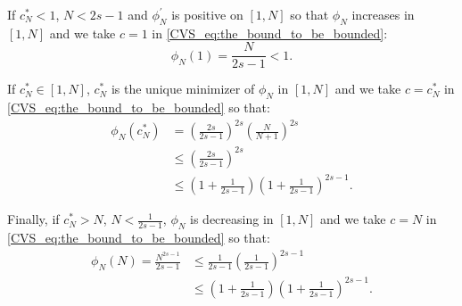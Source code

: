 \documentclass[twoside,11pt]{book}
\numberwithin{theorem}{chapter}
\numberwithin{definition}{chapter}
\numberwithin{proposition}{chapter}
\numberwithin{corollary}{chapter}
\numberwithin{example}{chapter}
\numberwithin{lemma}{chapter}
\numberwithin{assumption}{chapter}
\newcommand{\pc}[1]{\textcolor{blue}{#1}}
\newcommand{\rb}[1]{\textcolor{magenta}{#1}}
\begin{document}
If $c_{N}^{*}< 1$, $N < 2s-1$ and $\phi_{N}^{'}$ is positive on $[1,N]$ so that $\phi_{N}$ increases in $[1,N]$ and we take $c = 1$ in \eqref{CVS_eq:the_bound_to_be_bounded}:
\begin{equation}
\phi_{N}(1) = \frac{N}{2s-1} < 1.
\end{equation}

If $c_{N}^{*} \in [1,N]$, $c_{N}^{*}$ is the unique minimizer of $\phi_{N}$ in $[1,N]$ and we take $c = c_{N}^{*}$ in \eqref{CVS_eq:the_bound_to_be_bounded} so that: 
\begin{align}
\phi_{N}(c_{N}^{*}) &= \left(\frac{2s}{2s-1}\right)^{2s} \left(\frac{N}{N+1}\right)^{2s}\\
& \leq \left(\frac{2s}{2s-1}\right)^{2s}\\
& \leq \left(1+\frac{1}{2s-1}\right)\left(1+\frac{1}{2s-1}\right)^{2s-1}.
\label{CVS_e:useful_for_limits_as_well}
\end{align}

Finally, if $c_{N}^{*} > N$, $N < \frac{1}{2s-1}$, $\phi_{N}$ is decreasing in $[1,N]$ and we take $c = N$ in \eqref{CVS_eq:the_bound_to_be_bounded} so that:
\begin{align}
\phi_{N}(N) = \frac{N^{2s-1}}{2s-1} &\leq \frac{1}{2s-1} \left(\frac{1}{2s-1}\right)^{2s-1} \\
&\leq \left(1+\frac{1}{2s-1}\right) \left(1+\frac{1}{2s-1}\right)^{2s-1}. \label{CVS_e:useful_for_limits}
\end{align}





\end{document}
